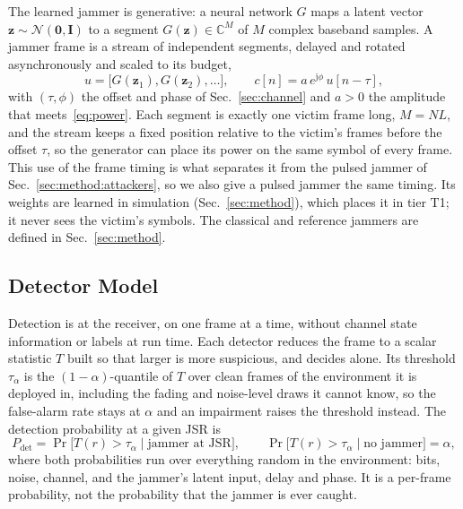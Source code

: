 The learned jammer is generative: a neural network $G$ maps a latent vector $\mathbf{z}\sim\mathcal{N}(\mathbf{0},\mathbf{I})$ to a segment $G(\mathbf{z})\in\mathbb{C}^{M}$ of $M$ complex baseband samples.
A jammer frame is a stream of independent segments, delayed and rotated asynchronously and scaled to its budget,
\begin{equation}
u=\bigl[G(\mathbf{z}_1),G(\mathbf{z}_2),\ldots\bigr],\qquad c[n]=a\,e^{\mathrm{j}\phi}\,u[n-\tau],
\label{eq:gan}
\end{equation}
with $(\tau,\phi)$ the offset and phase of Sec.~\ref{sec:channel} and $a>0$ the amplitude that meets~\eqref{eq:power}.
Each segment is exactly one victim frame long, $M=NL$, and the stream keeps a fixed position relative to the victim's frames before the offset $\tau$, so the generator can place its power on the same symbol of every frame.
This use of the frame timing is what separates it from the pulsed jammer of Sec.~\ref{sec:method:attackers}, so we also give a pulsed jammer the same timing.
Its weights are learned in simulation (Sec.~\ref{sec:method}), which places it in tier T1; it never sees the victim's symbols.
The classical and reference jammers are defined in Sec.~\ref{sec:method}.

\subsection{Detector Model}\label{sec:detector}
Detection is at the receiver, on one frame at a time, without channel state information or labels at run time.
Each detector reduces the frame to a scalar statistic $T$ built so that larger is more suspicious, and decides alone.
Its threshold $\tau_\alpha$ is the $(1-\alpha)$-quantile of $T$ over clean frames of the environment it is deployed in, including the fading and noise-level draws it cannot know, so the false-alarm rate stays at $\alpha$ and an impairment raises the threshold instead.
The detection probability at a given JSR is
\begin{equation}
P_{\mathrm{det}}=\Pr\bigl[T(r)>\tau_\alpha\mid\text{jammer at JSR}\bigr],\qquad \Pr\bigl[T(r)>\tau_\alpha\mid\text{no jammer}\bigr]=\alpha,
\label{eq:pdet}
\end{equation}
where both probabilities run over everything random in the environment: bits, noise, channel, and the jammer's latent input, delay and phase.
It is a per-frame probability, not the probability that the jammer is ever caught.


